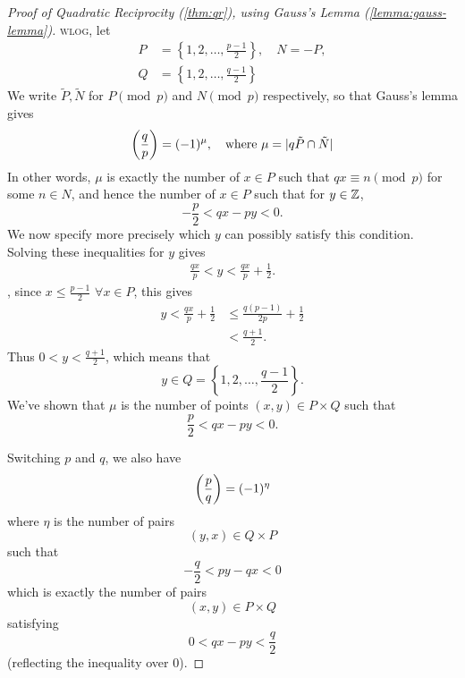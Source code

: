 \begin{proof}[Proof of Quadratic Reciprocity (\cref{thm:qr}), using Gauss's Lemma (\cref{lemma:gauss-lemma})]
    \textsc{wlog}, let
    \begin{align*}
        P & = \left\{1, 2, \dots, \frac{p-1}{2}\right\},\quad N=-P, \\
        Q & = \left\{1, 2, \dots, \frac{q-1}{2}\right\}
    \end{align*}
    We write $\tilde P, \tilde N$ for $P\pmod{p}$ and $N\pmod{p}$ respectively, so that Gauss's lemma gives
    \[\left(\dfrac{q}{p}\right) = (-1)^\mu, \quad\text{where }\mu = |q\tilde P\cap\tilde N|\]
    In other words, $\mu$ is exactly the number of $x\in P$ such that $qx\equiv n\pmod{p}$ for some $n\in N$, and hence the number of $x\in P$ such that for $y\in \mathbb Z$, \[-\frac{p}{2} < qx - py < 0.\]
    We now specify more precisely which $y$ can possibly satisfy this condition. Solving these inequalities for $y$ gives
    \begin{align*}
        \frac{qx}{p} < y < \frac{qx}{p}+\frac{1}{2}.
    \end{align*}
    \otoh, since $x\leq \frac{p-1}{2}$ $\forall x\in P$, this gives
    \begin{align*}
        y < \frac{qx}{p}+\frac{1}{2} & \leq \frac{q(p-1)}{2p}+\frac{1}{2} \\
                                     & < \frac{q+1}{2}.
    \end{align*}
    Thus $0 < y < \frac{q+1}{2}$, which means that
    \[y\in Q = \left\{1, 2, \dots, \frac{q-1}{2}\right\}.\]
    We've shown that $\mu$ is the number of points $(x, y)\in P\times Q$ such that
    \[\frac{p}{2} < qx - py < 0.\]

    Switching $p$ and $q$, we also have
    \[\left(\dfrac{p}{q}\right) = (-1)^\eta\]
    where $\eta$ is the number of pairs
    \[(y, x)\in Q\times P\]
    such that
    \[-\frac{q}{2} < py - qx < 0\]
    which is exactly the number of pairs
    \[(x, y)\in P\times Q\]
    satisfying
    \[0 < qx - py < \frac{q}{2}\]
    (reflecting the inequality over $0$).


\end{proof}
